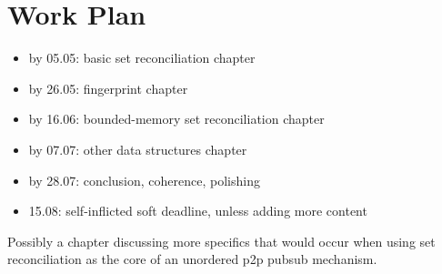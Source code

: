 \documentclass{article}
\begin{document}
\section*{Work Plan}

\begin{itemize}
\item by 05.05: basic set reconciliation chapter
\item by 26.05: fingerprint chapter
\item by 16.06: bounded-memory set reconciliation chapter
\item by 07.07: other data structures chapter
\item by 28.07: conclusion, coherence, polishing
\item 15.08: self-inflicted soft deadline, unless adding more content
\end{itemize}

Possibly a chapter discussing more specifics that would occur when using set reconciliation as the core of an unordered p2p pubsub mechanism.



\end{document}
